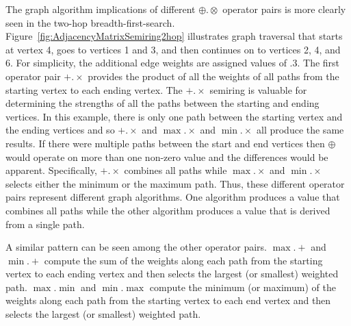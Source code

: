   The graph algorithm implications of different ${\oplus}.{\otimes}$ operator pairs is more clearly seen in the two-hop breadth-first-search.  Figure~\ref{fig:AdjacencyMatrixSemiring2hop} illustrates graph traversal that starts at vertex 4, goes to vertices 1 and 3, and then continues on to vertices 2, 4, and 6. For simplicity, the additional edge weights are assigned values of .3.  The first operator pair ${+}.{\times}$ provides the product of all the weights of all paths from the starting vertex to each ending vertex.  The ${+}.{\times}$ semiring is valuable for determining the strengths of all the paths between the starting and ending vertices.  In this example,  there is only one path between the starting vertex and the ending vertices and so ${+}.{\times}$ and ${\max}.{\times}$ and ${\min}.{\times}$ all produce the same results.  If there were multiple paths between the start and end vertices then $\oplus$ would operate on more than one non-zero value and the differences would be apparent.  Specifically, ${+}.{\times}$ combines all paths while ${\max}.{\times}$ and ${\min}.{\times}$ selects either the minimum or the maximum path.  Thus, these different operator pairs represent  different graph algorithms.  One algorithm produces a value that combines all paths while the other algorithm produces a value that is derived from a single path.

   A similar pattern can be seen among the other operator pairs.   ${\max}.{+}$ and ${\min}.{+}$ compute the sum of the weights along each path from the starting vertex to each ending vertex and then selects the largest (or smallest) weighted path.  ${\max}.{\min}$ and ${\min}.{\max}$ compute the minimum (or maximum) of the weights along each path from the starting vertex to each end vertex and then selects the largest (or smallest) weighted path.
   
